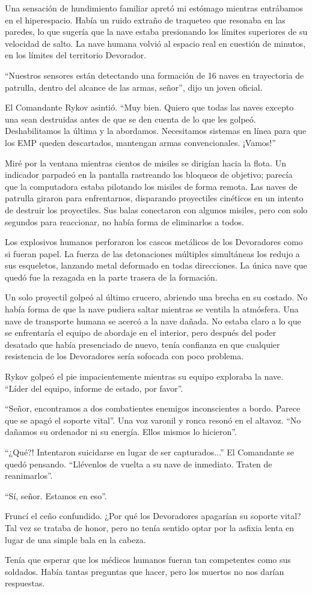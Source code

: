 Una sensación de hundimiento familiar apretó mi estómago mientras entrábamos en el hiperespacio. Había un ruido extraño de traqueteo que resonaba en las paredes, lo que sugería que la nave estaba presionando los límites superiores de su velocidad de salto. La nave humana volvió al espacio real en cuestión de minutos, en los límites del territorio Devorador.

``Nuestros sensores están detectando una formación de 16 naves en trayectoria de patrulla, dentro del alcance de las armas, señor'', dijo un joven oficial.

El Comandante Rykov asintió. ``Muy bien. Quiero que todas las naves excepto una sean destruidas antes de que se den cuenta de lo que les golpeó. Deshabilitamos la última y la abordamos. Necesitamos sistemas en línea para que los EMP queden descartados, mantengan armas convencionales. ¡Vamos!''

Miré por la ventana mientras cientos de misiles se dirigían hacia la flota. Un indicador parpadeó en la pantalla rastreando los bloqueos de objetivo; parecía que la computadora estaba pilotando los misiles de forma remota. Las naves de patrulla giraron para enfrentarnos, disparando proyectiles cinéticos en un intento de destruir los proyectiles. Sus balas conectaron con algunos misiles, pero con solo segundos para reaccionar, no había forma de eliminarlos a todos.

Los explosivos humanos perforaron los cascos metálicos de los Devoradores como si fueran papel. La fuerza de las detonaciones múltiples simultáneas los redujo a sus esqueletos, lanzando metal deformado en todas direcciones. La única nave que quedó fue la rezagada en la parte trasera de la formación.

Un solo proyectil golpeó al último crucero, abriendo una brecha en su costado. No había forma de que la nave pudiera saltar mientras se ventila la atmósfera. Una nave de transporte humana se acercó a la nave dañada. No estaba claro a lo que se enfrentaría el equipo de abordaje en el interior, pero después del poder desatado que había presenciado de nuevo, tenía confianza en que cualquier resistencia de los Devoradores sería sofocada con poco problema.

Rykov golpeó el pie impacientemente mientras su equipo exploraba la nave. ``Líder del equipo, informe de estado, por favor''.

``Señor, encontramos a dos combatientes enemigos inconscientes a bordo. Parece que se apagó el soporte vital''. Una voz varonil y ronca resonó en el altavoz. ``No dañamos su ordenador ni su energía. Ellos mismos lo hicieron''.

``¿Qué?! Intentaron suicidarse en lugar de ser capturados...'' El Comandante se quedó pensando. ``Llévenlos de vuelta a su nave de inmediato. Traten de reanimarlos''.

``Sí, señor. Estamos en eso''.

Fruncí el ceño confundido. ¿Por qué los Devoradores apagarían su soporte vital? Tal vez se trataba de honor, pero no tenía sentido optar por la asfixia lenta en lugar de una simple bala en la cabeza.

Tenía que esperar que los médicos humanos fueran tan competentes como sus soldados. Había tantas preguntas que hacer, pero los muertos no nos darían respuestas.